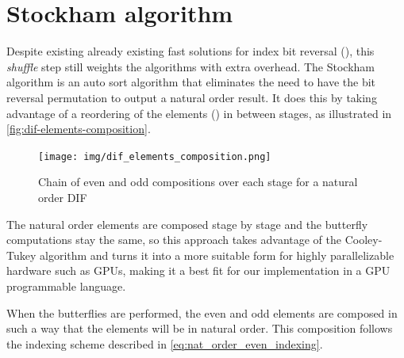 \documentclass[
  oneside,
  11pt, a4paper,
  footinclude=true,
  headinclude=true,
  cleardoublepage=empty
]{scrbook}
\begin{document}


\section{Stockham algorithm} \label{subsec:stockham-algorithm}

Despite existing already existing fast solutions for index bit reversal (\cite{prado2004new}), this \textit{shuffle} step still weights the algorithms with extra overhead. The Stockham algorithm is an auto sort algorithm that eliminates the need to have the bit reversal permutation to output a natural order result. It does this by taking advantage of a reordering of the elements (\cite{govindaraju2008high}) in between stages, as illustrated in \autoref{fig:dif-elements-composition}.

\begin{figure}[h] 
    \centering
    \texttt{[image: img/dif\_elements\_composition.png]}
    \caption{Chain of even and odd compositions over each stage for a natural order DIF}
    \label{fig:dif-elements-composition}
\end{figure}

The natural order elements are composed stage by stage and the butterfly computations stay the same, so this approach takes advantage of the Cooley-Tukey algorithm and turns it into a more suitable form for highly parallelizable hardware such as GPUs, making it a best fit for our implementation in a GPU programmable language. \newline

When the butterflies are performed, the even and odd elements are composed in such a way that the elements will be in natural order. This composition follows the indexing scheme described in \autoref{eq:nat_order_even_indexing}.
\end{document}
